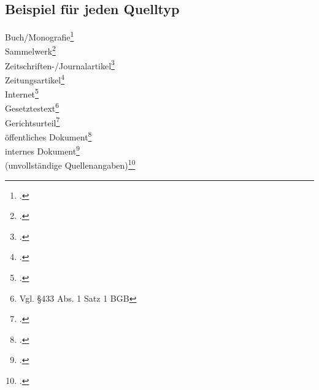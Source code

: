 \subsection{Beispiel für jeden Quelltyp}

Buch/Monografie\footcite[Vgl.][]{theisen2011}\\
Sammelwerk\footcite[Vgl.][]{maier2004}\\
Zeitschriften-/Journalartikel\footcite[Vgl.][]{chodorowreich2022loan}\\
Zeitungsartikel\footcite[Vgl.][]{dick2012neugierige}\\
Internet\footcite[Vgl.][]{capital2014}\\
Gesetztestext\footnote{Vgl. §433 Abs. 1 Satz 1 BGB}\nocite{bgb}\\
Gerichtsurteil\footcite[Vgl.][]{bverfgh1968}\\
öffentliches Dokument\footcite[Vgl.][]{eu2022access}\\
internes Dokument\footcite[Vgl.][]{abcorganigramm}\\%
(unvollständige Quellenangaben)\footcite[Vgl.][]{blankmaier}\\